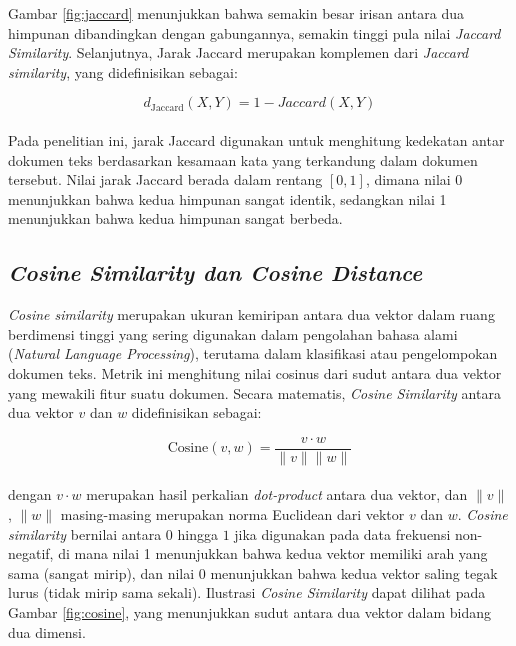 \documentclass[a4paper,12pt]{report}
\numberwithin{equation}{chapter}
\begin{document}
Gambar \ref{fig:jaccard} menunjukkan bahwa semakin besar irisan antara dua himpunan dibandingkan dengan gabungannya, semakin tinggi pula nilai \textit{Jaccard Similarity}. Selanjutnya, Jarak Jaccard merupakan komplemen dari \textit{Jaccard similarity}, yang didefinisikan sebagai:

\begin{equation}
    d_{\text{Jaccard}}(X, Y) = 1 - Jaccard(X, Y)
   \label{eq:jarakjaccard}
\end{equation}
\\
Pada penelitian ini, jarak Jaccard digunakan untuk menghitung kedekatan antar dokumen teks berdasarkan kesamaan kata yang terkandung dalam dokumen tersebut. Nilai jarak Jaccard berada dalam rentang $[0,1]$, dimana nilai 0 menunjukkan bahwa kedua himpunan sangat identik, sedangkan nilai 1 menunjukkan bahwa kedua himpunan sangat berbeda.



\subsection{\textit{Cosine Similarity dan Cosine Distance}}
\label{subsec:Cosine}

\textit{Cosine similarity} merupakan ukuran kemiripan antara dua vektor dalam ruang berdimensi tinggi yang sering digunakan dalam pengolahan bahasa alami (\textit{Natural Language Processing}), terutama dalam klasifikasi atau pengelompokan dokumen teks. Metrik ini menghitung nilai cosinus dari sudut antara dua vektor yang mewakili fitur suatu dokumen. Secara matematis, \textit{Cosine Similarity} antara dua vektor $v$ dan $w$ didefinisikan sebagai:

\begin{equation}
    \text{Cosine}(v, w) = \frac{v \cdot w}{\|v\| \|w\|}
    \label{eq:cosine}
\end{equation}
\\
dengan $v \cdot w$ merupakan hasil perkalian \textit{dot-product} antara dua vektor, dan $\|v\|$, $\|w\|$ masing-masing merupakan norma Euclidean dari vektor $v$ dan $w$. \textit{Cosine similarity} bernilai antara $0$ hingga $1$ jika digunakan pada data frekuensi non-negatif, di mana nilai 1 menunjukkan bahwa kedua vektor memiliki arah yang sama (sangat mirip), dan nilai 0 menunjukkan bahwa kedua vektor saling tegak lurus (tidak mirip sama sekali). Ilustrasi \textit{Cosine Similarity} dapat dilihat pada Gambar \ref{fig:cosine}, yang menunjukkan sudut antara dua vektor dalam bidang dua dimensi.
\end{document}
